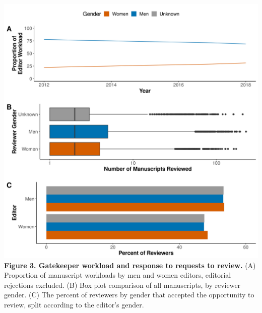\documentclass[11pt,]{article}
\begin{document}
\newpage

\includegraphics{Figure_3.png} \textbf{Figure 3. Gatekeeper workload and
response to requests to review.} (A) Proportion of manuscript workloads
by men and women editors, editorial rejections excluded. (B) Box plot
comparison of all manuscripts, by reviewer gender. (C) The percent of
reviewers by gender that accepted the opportunity to review, split
according to the editor's gender.

\newpage
\end{document}
